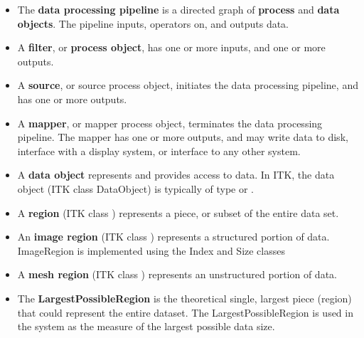 \begin{itemize}
        \item The \textbf{data processing pipeline} is a directed graph of
        \textbf{process} and \textbf{data objects}. The pipeline inputs,
        operators on, and outputs data.

        \item A \textbf{filter}, or \textbf{process object}, has one or more
        inputs, and one or more outputs.

        \item A \textbf{source}, or source process object, initiates the data
        processing pipeline, and has one or more outputs.

        \item A \textbf{mapper}, or mapper process object, terminates the
        data processing pipeline. The mapper has one or more outputs, and may
        write data to disk, interface with a display system, or interface to
        any other system.

        \item A \textbf{data object} represents and provides access to
        data. In ITK, the data object (ITK class DataObject) is typically of
        type  or .

        \item A \textbf{region} (ITK class ) represents a piece,
        or subset of the entire data set.

        \item An \textbf{image region} (ITK class )
        represents a structured portion of data. ImageRegion is implemented
        using the Index and Size classes

        \item A \textbf{mesh region} (ITK class ) represents
        an unstructured portion of data.

        \item The \textbf{LargestPossibleRegion} is the theoretical single,
        largest piece (region) that could represent the entire dataset. The
        LargestPossibleRegion is used in the system as the measure of the
        largest possible data size.


\end{itemize}
